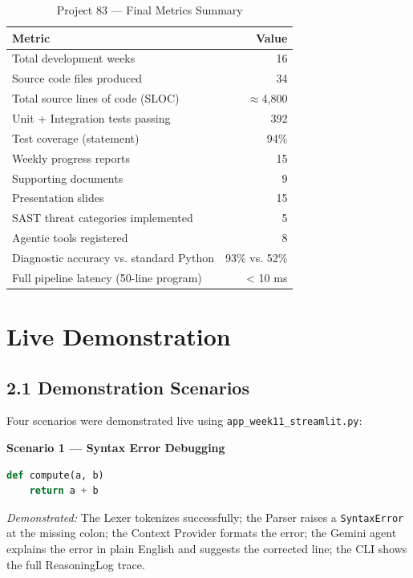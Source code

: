 \documentclass[a4paper,11pt]{article}
\begin{document}
\begin{table}[h]
\centering
\begin{tabularx}{\textwidth}{|l|r|}
\hline
\rowcolor{green!10}
\textbf{Metric} & \textbf{Value} \\
\hline
Total development weeks & 16 \\
\hline
Source code files produced & 34 \\
\hline
Total source lines of code (SLOC) & $\approx$4,800 \\
\hline
Unit + Integration tests passing & 392 \\
\hline
Test coverage (statement) & 94\% \\
\hline
Weekly progress reports & 15 \\
\hline
Supporting documents & 9 \\
\hline
Presentation slides & 15 \\
\hline
SAST threat categories implemented & 5 \\
\hline
Agentic tools registered & 8 \\
\hline
Diagnostic accuracy vs. standard Python & 93\% vs. 52\% \\
\hline
Full pipeline latency (50-line program) & < 10 ms \\
\hline
\end{tabularx}
\caption{Project 83 --- Final Metrics Summary}
\end{table}

\section{Live Demonstration}

\subsection{2.1 Demonstration Scenarios}

Four scenarios were demonstrated live using \texttt{app\_week11\_streamlit.py}:

\textbf{Scenario 1 --- Syntax Error Debugging}

\begin{lstlisting}[language=Python, caption=Demo input: syntax error (missing colon)]
def compute(a, b)
    return a + b
\end{lstlisting}

\textit{Demonstrated:} The Lexer tokenizes successfully; the Parser raises a \texttt{SyntaxError} at the missing colon; the Context Provider formats the error; the Gemini agent explains the error in plain English and suggests the corrected line; the CLI shows the full ReasoningLog trace.
\end{document}
